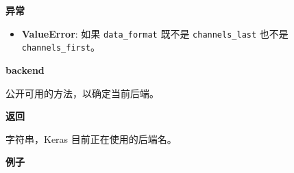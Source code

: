 \textbf{异常}

\begin{itemize}
\tightlist
\item
  \textbf{ValueError}: 如果 \texttt{data\_format} 既不是
  \texttt{channels\_last} 也不是 \texttt{channels\_first}。
\end{itemize}


\textbf{backend}\label{backend}

\begin{Shaded}
\begin{Highlighting}[]
\end{Highlighting}
\end{Shaded}

公开可用的方法，以确定当前后端。

\textbf{返回}

字符串，Keras 目前正在使用的后端名。

\textbf{例子}

\begin{Shaded}
\begin{Highlighting}[]
\OperatorTok{>>>} 
\end{Highlighting}
\end{Shaded}

\newpage
